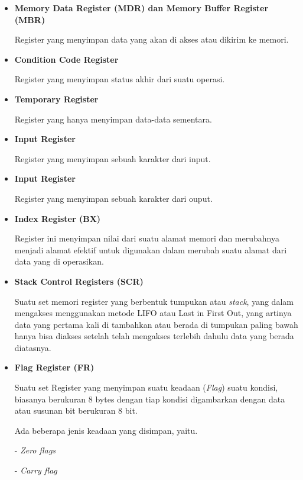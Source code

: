 \begin{enumerate}
\begin{itemize}
      \item \textbf{Memory Data Register (MDR) dan Memory Buffer Register (MBR)}

        Register yang menyimpan data yang akan di akses atau dikirim ke memori.

      \item \textbf{Condition Code Register}

        Register yang menyimpan status akhir dari suatu operasi.

      \item \textbf{Temporary Register}

        Register yang hanya menyimpan data-data sementara.

      \item \textbf{Input Register}

        Register yang menyimpan sebuah karakter dari input.

      \item \textbf{Input Register}

        Register yang menyimpan sebuah karakter dari ouput.

      \item \textbf{Index Register (BX)}

        Register ini menyimpan nilai dari suatu alamat memori dan merubahnya
        menjadi alamat efektif untuk digunakan dalam merubah suatu alamat dari
        data yang di operasikan.

      \item \textbf{Stack Control Registers (SCR)}

        Suatu set memori register yang berbentuk tumpukan atau \textit{stack},
        yang dalam mengakses menggunakan metode LIFO atau Last in First Out, yang
        artinya data yang pertama kali di tambahkan atau berada di tumpukan paling
        bawah hanya bisa diakses setelah telah mengakses terlebih dahulu data
        yang berada diatasnya.

      \item \textbf{Flag Register (FR)}

        Suatu set Register yang menyimpan suatu keadaan (\textit{Flag}) suatu kondisi,
        biasanya berukuran 8 bytes dengan tiap kondisi digambarkan dengan data
        atau susunan bit berukuran 8 bit.

        Ada beberapa jenis keadaan yang disimpan, yaitu.

        - \textit{Zero flags}

        - \textit{Carry flag}


\end{itemize}
\end{enumerate}
